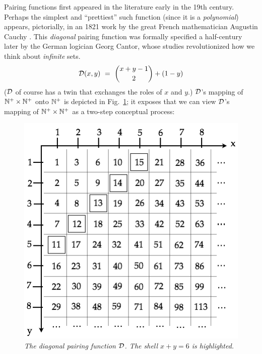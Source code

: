 \medskip

 
Pairing functions first appeared in the literature early in the 19th century.  Perhaps the simplest and ``prettiest'' such function (since it is a {\em polynomial}) appears, pictorially, in an 1821 work by the great French mathematician Augustin Cauchy \cite{Cauchy21}.  This {\em diagonal} pairing function was formally specified a half-century later by the German logician Georg Cantor, whose studies \cite{Cantor74,Cantor78} revolutionized how we think about {\em infinite} sets.
\begin{equation}
\label{eq:diag}
\mbox{$\cal D$}(x, y) \ = \
{{x+y-1} \choose 2} + (1-y)
\end{equation}
($\mbox{$\cal D$}$ of course has a twin that exchanges the roles of $x$ and $y$.)  $\mbox{$\cal D$}$'s mapping of $\mathbb{N}^+ \times \mathbb{N}^+$ onto $\mathbb{N}^+$ is depicted in Fig.~\ref{fig:diag}; it exposes that we can view $\mbox{$\cal D$}$'s mapping of $\mathbb{N}^+ \times \mathbb{N}^+$ as a two-step conceptual process:
\begin{figure}[htb]
\begin{center}
      \includegraphics[scale=0.4]{FiguresArithmetic/PairingDiagonal}
\end{center}
\caption{{\it The diagonal pairing function $\mbox{$\cal D$}$.  The shell $x+y = 6$
    is highlighted.}
\label{fig:diag}}
\end{figure}
